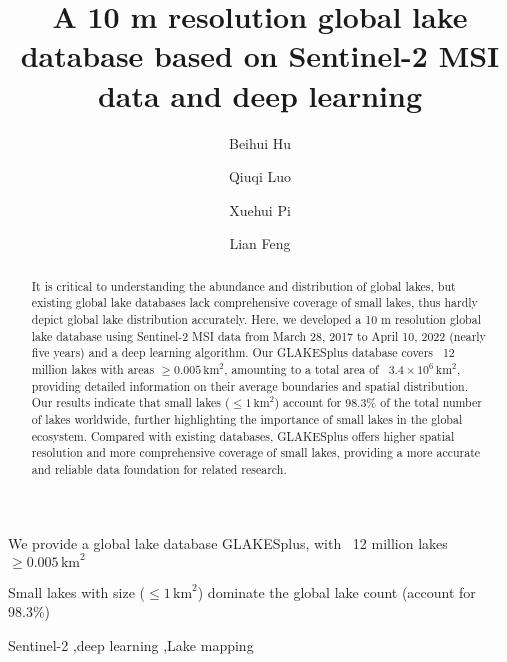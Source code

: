 \documentclass[preprint,12pt,authoryear]{elsarticle}
\begin{document}
\begin{frontmatter}


\title{A 10 m resolution global lake database based on Sentinel-2 MSI data and deep learning} %
\author{Beihui Hu}
\author{Qiuqi Luo}
\author{Xuehui Pi}
\author{Lian Feng} %


\begin{abstract}
It is critical to understanding the abundance and distribution of global lakes, but existing global lake databases lack comprehensive coverage of small lakes, thus hardly depict global lake distribution accurately. Here, we developed a 10 m resolution global lake database using Sentinel-2 MSI data from March 28, 2017 to April 10, 2022 (nearly five years) and a deep learning algorithm. Our GLAKESplus database covers ~12 million lakes with areas  $\ge 0.005\,\text{km}^2$, amounting to a total area of ~$3.4\times10^{6}\,\text{km}^2$, providing detailed information on their average boundaries and spatial distribution. Our results indicate that small lakes ($\le 1\,\text{km}^2$) account for 98.3\% of the total number of lakes worldwide, further highlighting the importance of small lakes in the global ecosystem. Compared with existing databases, GLAKESplus offers higher spatial resolution and more comprehensive coverage of small lakes, providing a more accurate and reliable data foundation for related research.
\end{abstract}

\begin{highlights}
\item We provide a global lake database GLAKESplus, with ~12 million lakes $\ge 0.005\,\text{km}^2$
\item Small lakes with size ($\le 1\,\text{km}^2$) dominate the global lake count (account for 98.3\%)
\end{highlights}

\begin{keyword}
Sentinel-2 \sep deep learning \sep Lake mapping

\end{keyword}

\end{frontmatter}
\end{document}
